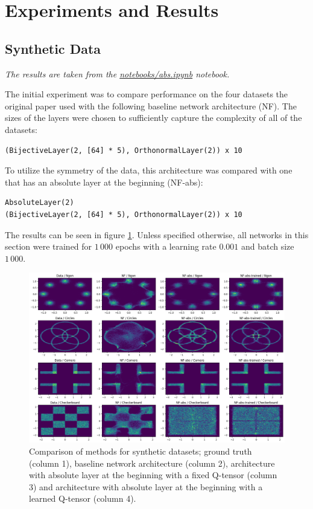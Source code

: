 \section{Experiments and Results}\label{sec:exp_and_results}

\subsection{Synthetic Data}\label{sec:synthetic}


\textit{The results are taken from the \href{https://github.com/xiaoxiae/GNNFinal2024/blob/main/notebooks/abs.ipynb}{notebooks/abs.ipynb} notebook.}

The initial experiment was to compare performance on the four datasets the original paper used with the following baseline network architecture (NF). The sizes of the layers were chosen to sufficiently capture the complexity of all of the datasets:


\begin{verbatim}
(BijectiveLayer(2, [64] * 5), OrthonormalLayer(2)) x 10
\end{verbatim}

To utilize the symmetry of the data, this architecture was compared with one that has an absolute layer at the beginning (NF-abs):

\begin{verbatim}
AbsoluteLayer(2)
(BijectiveLayer(2, [64] * 5), OrthonormalLayer(2)) x 10
\end{verbatim}

The results can be seen in figure \ref{fig:abs-default}. Unless specified otherwise, all networks in this section were trained for $1\,000$ epochs with a learning rate $0.001$ and batch size $1\,000$.

\begin{figure}[H]
    \centering
    \includegraphics[width=.85\linewidth]{images/synthetic/abs-default.png}
    \caption{Comparison of methods for synthetic datasets; ground truth (column 1), baseline network architecture (column 2), architecture with absolute layer at the beginning with a fixed Q-tensor (column 3) and architecture with absolute layer at the beginning with a learned Q-tensor (column 4).}
    \label{fig:abs-default}
\end{figure}

